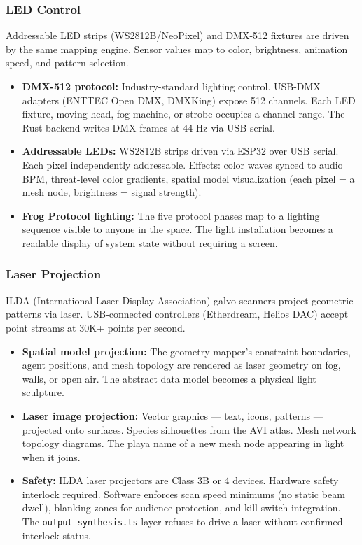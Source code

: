 \documentclass[11pt,letterpaper]{article}
\begin{document}
\subsubsection{LED Control}

Addressable LED strips (WS2812B/NeoPixel) and DMX-512 fixtures are driven by the same mapping engine. Sensor values map to color, brightness, animation speed, and pattern selection.

\begin{itemize}[leftmargin=2em]
\item \textbf{DMX-512 protocol:} Industry-standard lighting control. USB-DMX adapters (ENTTEC Open DMX, DMXKing) expose 512 channels. Each LED fixture, moving head, fog machine, or strobe occupies a channel range. The Rust backend writes DMX frames at 44 Hz via USB serial.
\item \textbf{Addressable LEDs:} WS2812B strips driven via ESP32 over USB serial. Each pixel independently addressable. Effects: color waves synced to audio BPM, threat-level color gradients, spatial model visualization (each pixel = a mesh node, brightness = signal strength).
\item \textbf{Frog Protocol lighting:} The five protocol phases map to a lighting sequence visible to anyone in the space. The light installation becomes a readable display of system state without requiring a screen.
\end{itemize}

\subsubsection{Laser Projection}

ILDA (International Laser Display Association) galvo scanners project geometric patterns via laser. USB-connected controllers (Etherdream, Helios DAC) accept point streams at 30K+ points per second.

\begin{itemize}[leftmargin=2em]
\item \textbf{Spatial model projection:} The geometry mapper's constraint boundaries, agent positions, and mesh topology are rendered as laser geometry on fog, walls, or open air. The abstract data model becomes a physical light sculpture.
\item \textbf{Laser image projection:} Vector graphics --- text, icons, patterns --- projected onto surfaces. Species silhouettes from the AVI atlas. Mesh network topology diagrams. The playa name of a new mesh node appearing in light when it joins.
\item \textbf{Safety:} ILDA laser projectors are Class 3B or 4 devices. Hardware safety interlock required. Software enforces scan speed minimums (no static beam dwell), blanking zones for audience protection, and kill-switch integration. The \texttt{output-synthesis.ts} layer refuses to drive a laser without confirmed interlock status.
\end{itemize}
\end{document}
